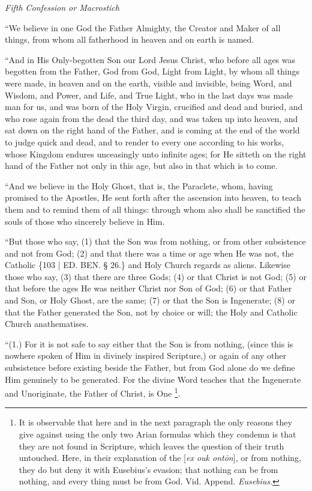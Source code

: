 \emph{Fifth
Confession or Macrostich}

``We believe in one God the
Father Almighty, the Creator and Maker of all things, from whom all
fatherhood in heaven and on earth is named.

``And in His Only-begotten Son
our Lord Jesus Christ, who before all ages was begotten from the
Father, God from God, Light from Light, by whom all things were made,
in heaven and on the earth, visible and invisible, being Word, and
Wisdom, and Power, and Life, and True Light, who in the last days was
made man for us, and was born of the Holy Virgin, crucified and dead
and buried, and who rose again from the dead the third day, and was
taken up into heaven, and sat down on the right hand of the Father,
and is coming at the end of the world to judge quick and dead, and to
render to every one according to his works, whose Kingdom endures
unceasingly unto infinite ages; for He sitteth on the right hand of
the Father not only in this age, but also in that which is to come.

``And we believe in the Holy
Ghost, that is, the Paraclete, whom, having promised to the Apostles,
He sent forth after the ascension into heaven, to teach them and to
remind them of all things: through whom also shall be sanctified the
souls of those who sincerely believe in Him.

``But those who say, (1) that
the Son was from nothing, or from other subsistence and not from God;
(2) and that there was a time or age when He was not, the Catholic
\{103 | ED.
BEN. § 26.\} and Holy Church regards as aliens.
Likewise those who say, (3) that there are three Gods; (4) or that
Christ is not God; (5) or that before the ages He was neither Christ
nor Son of God; (6) or that Father and Son, or Holy Ghost, are the
same; (7) or that the Son is Ingenerate; (8) or that the Father
generated the Son, not by choice or will; the Holy and Catholic Church
anathematises.

``(1.) For it is not safe to
say either that the Son is from nothing, (since this is nowhere spoken
of Him in divinely inspired Scripture,) or again of any other
subsistence before existing beside the Father, but from God alone do
we define Him genuinely to be generated. For the divine Word teaches
that the Ingenerate and Unoriginate, the Father of Christ, is One \footnote{It is observable that here and in the next paragraph the only reasons
they give against using the only two Arian formulas which they condemn
is that they are not found in Scripture, which leaves the question of
their truth untouched. Here, in their explanation of the [\emph{ex ouk
ont\={o}n}], or from nothing, they do but deny it with Eusebius's
evasion; that nothing can be from nothing, and every thing must be
from God. Vid. Append. \emph{Eusebius}.}.

